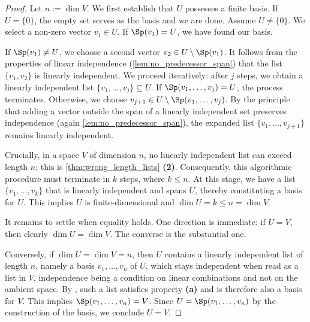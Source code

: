 \begin{proof}
Let $n := \dim V$. We first establish that $U$ possesses a finite basis. If $U = \{0\}$, the empty set serves as the basis and we are done. Assume $U \neq \{0\}$. We select a non-zero vector $v_1 \in U$. If $\Sp(v_1) = U$, we have found our basis. 

If $\Sp(v_1) \neq U$, we choose a second vector $v_2 \in U \setminus \Sp(v_1)$. It follows from the properties of linear independence (\cref{lem:no_predecessor_span}) that the list $\{v_1, v_2\}$ is linearly independent. We proceed iteratively: after $j$ steps, we obtain a linearly independent list $\{v_1, \dots, v_j\} \subseteq U$. If $\Sp(v_1, \dots, v_j) = U$, the process terminates. Otherwise, we choose $v_{j+1} \in U \setminus \Sp(v_1, \dots, v_j)$. By the principle that adding a vector outside the span of a linearly independent set preserves independence (again \cref{lem:no_predecessor_span}), the expanded list $\{v_1, \dots, v_{j+1}\}$ remains linearly independent.

Crucially, in a space $V$ of dimension $n$, no linearly independent list can exceed length $n$; this is \cref{thm:wrong_length_lists} \textbf{(2)}. Consequently, this algorithmic procedure must terminate in $k$ steps, where $k \le n$. At this stage, we have a list $\{v_1, \dots, v_k\}$ that is linearly independent and spans $U$, thereby constituting a basis for $U$. This implies $U$ is finite-di\-men\-sional and $\dim U = k \le n = \dim V$.

It remains to settle when equality holds. One direction is immediate: if $U = V$, then clearly $\dim U = \dim V$. The converse is the substantial one.

Conversely, if $\dim U = \dim V = n$, then $U$ contains a linearly independent list of length $n$, namely a basis $v_1, \dots, v_n$ of $U$, which stays independent when read as a list in $V$, independence being a condition on linear combinations and not on the ambient space. By , such a list satisfies property \textbf{(a)} and is therefore also a basis for $V$. This implies $\Sp(v_1, \dots, v_n) = V$. Since $U = \Sp(v_1, \dots, v_n)$ by the construction of the basis, we conclude $U = V$.
\end{proof}

